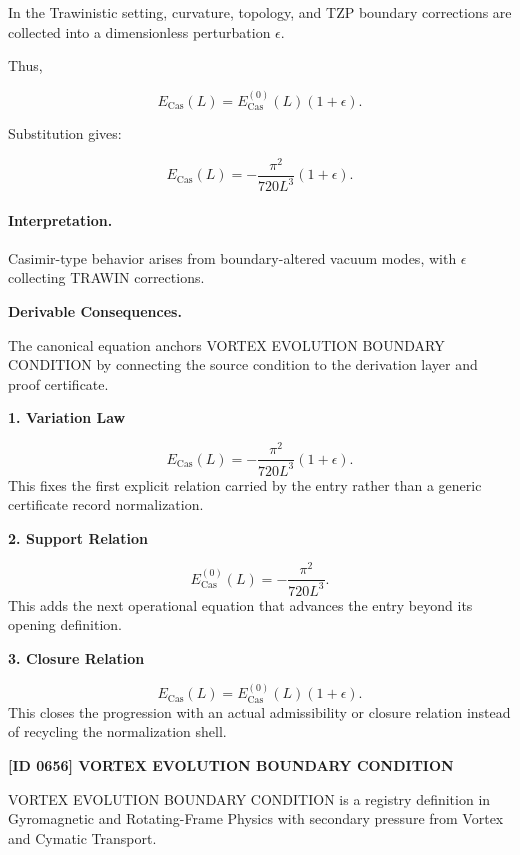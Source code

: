 In the Trawinistic setting, curvature, topology, and TZP boundary corrections are collected into a dimensionless perturbation $\epsilon$.

Thus,

\begin{equation}
E_{\mathrm{Cas}}(L)
=
E_{\mathrm{Cas}}^{(0)}(L)(1+\epsilon).
\end{equation}

Substitution gives:

\begin{equation}
\boxed{
E_{\mathrm{Cas}}(L)
=
-\frac{\pi^2}{720L^3}(1+\epsilon).
}
\end{equation}

\paragraph{Interpretation.}
Casimir-type behavior arises from boundary-altered vacuum modes, with $\epsilon$ collecting TRAWIN corrections.

\par\vspace{0.35em}
\noindent\textbf{Derivable Consequences.}\quad
\begingroup
\footnotesize
\raggedright
The canonical equation anchors VORTEX EVOLUTION BOUNDARY CONDITION by connecting the source condition to the derivation layer and proof certificate.
\par\endgroup

\noindent\textbf{1. Variation Law}\par
\[
E_{\mathrm{Cas}}(L) = -\frac{\pi^2}{720L^3}(1+\epsilon).
\]
\noindent This fixes the first explicit relation carried by the entry rather than a generic certificate record normalization.\par
\noindent\textbf{2. Support Relation}\par
\[
E_{\mathrm{Cas}}^{(0)}(L) = -\frac{\pi^2}{720L^3}.
\]
\noindent This adds the next operational equation that advances the entry beyond its opening definition.\par
\noindent\textbf{3. Closure Relation}\par
\[
E_{\mathrm{Cas}}(L) = E_{\mathrm{Cas}}^{(0)}(L)(1+\epsilon).
\]
\noindent This closes the progression with an actual admissibility or closure relation instead of recycling the normalization shell.\par

\clearpage
\noindent\textbf{[ID 0656] VORTEX EVOLUTION BOUNDARY CONDITION}\par
\vspace{0.35em}
\begingroup\small
{}
VORTEX EVOLUTION BOUNDARY CONDITION is a registry definition in Gyromagnetic and Rotating-Frame Physics with secondary pressure from Vortex and Cymatic Transport.

